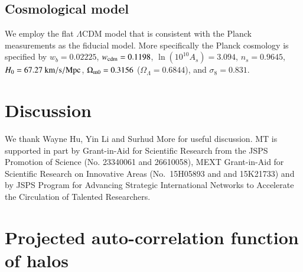 \documentclass[onecolumn,notitlepage,showpacs,amsmath,amssymb,prd,floatfix]{revtex4-1}
\begin{document}
\subsection{Cosmological model}

We employ the flat $\Lambda$CDM model that is consistent with the Planck
measurements \cite{PlanckCosmo} as the fiducial model. More specifically
the Planck cosmology is specified by $w_b=0.02225$, $w_{\rm
cdm}=0.1198$, $\ln(10^{10}A_s)=3.094$, $n_s=0.9645$, $H_0=67.27~{\rm
km/s/Mpc}$, $\Omega_{\rm m0}=0.3156$ ($\Omega_{\Lambda}=0.6844$), and
$\sigma_8=0.831$.




\section{Discussion}


 We thank Wayne Hu, Yin Li and Surhud
More for useful discussion. MT is supported in part by Grant-in-Aid for
Scientific Research from the JSPS Promotion of Science (No. 23340061 and
26610058), MEXT Grant-in-Aid for Scientific Research on Innovative Areas
(No.~15H05893 and and 15K21733) and by JSPS Program for Advancing Strategic International
Networks to Accelerate the Circulation of Talented Researchers.





\appendix

\section{Projected auto-correlation function of halos}
\end{document}
